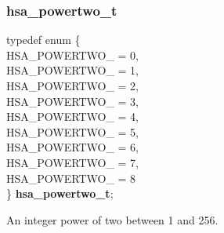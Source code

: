 \documentclass[final,oneside]{book}
\newcommand{\reftyp}[1]{#1}
\newcommand{\refenu}[1]{\reftyp{#1}}
\newenvironment{mylongtable}{\rowcolors{0}{lightgray}{lightgray}\longtable} {
\endlongtable}
\begin{document}
\subsubsection{hsa_\-powertwo_\-t}
\vspace{-5.5mm}\begin{mylongtable}{@{}p{\textwidth}}
\rule{0pt}{3ex}typedef enum \{\\\hspace{1.7em}\hypertarget{group__common_1gga45e8c4edc00ad0dc2c9e6e14e8610977a13bfa83a83c0f555efe4bbcca6b9cddf}{\refenu{HSA_\-POWERTWO_}} = 0,\\
\hspace{1.7em}\hypertarget{group__common_1gga45e8c4edc00ad0dc2c9e6e14e8610977a465003dadda71ae8589097dd03202daf}{\refenu{HSA_\-POWERTWO_}} = 1,\\
\hspace{1.7em}\hypertarget{group__common_1gga45e8c4edc00ad0dc2c9e6e14e8610977a04e128660c6aee9bd09b8be8683a4df9}{\refenu{HSA_\-POWERTWO_}} = 2,\\
\hspace{1.7em}\hypertarget{group__common_1gga45e8c4edc00ad0dc2c9e6e14e8610977a6b602015c0db012f426e22c0354fbd05}{\refenu{HSA_\-POWERTWO_}} = 3,\\
\hspace{1.7em}\hypertarget{group__common_1gga45e8c4edc00ad0dc2c9e6e14e8610977abc59007bbaea149704bb50a1aa70b7aa}{\refenu{HSA_\-POWERTWO_}} = 4,\\
\hspace{1.7em}\hypertarget{group__common_1gga45e8c4edc00ad0dc2c9e6e14e8610977af13ebd4aecb93fd78bee555d26ed62a7}{\refenu{HSA_\-POWERTWO_}} = 5,\\
\hspace{1.7em}\hypertarget{group__common_1gga45e8c4edc00ad0dc2c9e6e14e8610977a93252b7ad8bdcbec33390212e8897bd5}{\refenu{HSA_\-POWERTWO_}} = 6,\\
\hspace{1.7em}\hypertarget{group__common_1gga45e8c4edc00ad0dc2c9e6e14e8610977ae78a1c50ad98ae134e34186acd52174e}{\refenu{HSA_\-POWERTWO_}} = 7,\\
\hspace{1.7em}\hypertarget{group__common_1gga45e8c4edc00ad0dc2c9e6e14e8610977ae774bb9d85b5f7f9968ab76e50c23a6b}{\refenu{HSA_\-POWERTWO_}} = 8\\
\} \hypertarget{group__common_1ga45e8c4edc00ad0dc2c9e6e14e8610977}{\textbf{hsa_\-powertwo_\-t}};\rule[-2ex]{0pt}{0pt}\end{mylongtable}
\vspace{-5mm}An integer power of two between 1 and 256.
\end{document}
